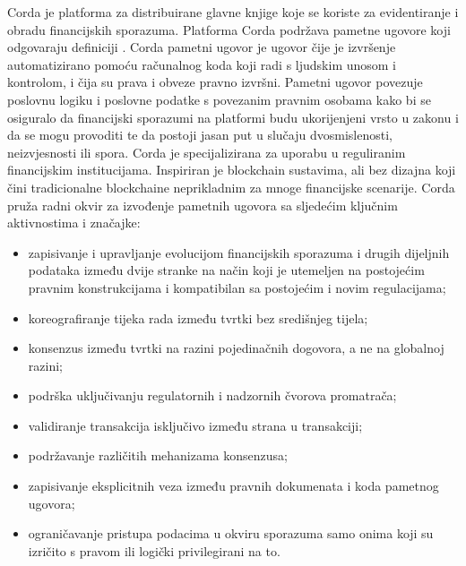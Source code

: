 \documentclass[times, utf8, diplomski]{fer}
\begin{document}
Corda je platforma za distribuirane glavne knjige koje se koriste za evidentiranje i obradu financijskih sporazuma. Platforma Corda podržava pametne ugovore koji odgovaraju definiciji \cite{Corda}. Corda pametni ugovor je ugovor čije je izvršenje automatizirano pomoću računalnog koda koji radi s ljudskim unosom i kontrolom, i čija su prava i obveze pravno izvršni. Pametni ugovor povezuje poslovnu logiku i poslovne podatke s povezanim pravnim osobama kako bi se osiguralo da financijski sporazumi na platformi budu ukorijenjeni vrsto u zakonu i da se mogu provoditi te da postoji jasan put u slučaju dvosmislenosti, neizvjesnosti ili spora.
Corda je specijalizirana za uporabu u reguliranim financijskim institucijama. Inspiriran je blockchain sustavima, ali bez dizajna koji čini tradicionalne blockchaine neprikladnim za mnoge financijske scenarije. Corda pruža radni okvir za izvođenje pametnih ugovora sa sljedećim ključnim aktivnostima i značajke:

\begin{itemize}

\item zapisivanje i upravljanje evolucijom financijskih sporazuma i drugih dijeljnih podataka između dvije stranke na način koji je utemeljen na postojećim pravnim konstrukcijama i kompatibilan sa postojećim i novim regulacijama;

\item koreografiranje tijeka rada između tvrtki bez središnjeg tijela;

\item konsenzus između tvrtki na razini pojedinačnih dogovora, a ne na globalnoj razini;

\item podrška uključivanju regulatornih i nadzornih čvorova promatrača;

\item validiranje transakcija isključivo između strana u transakciji;

\item podržavanje različitih mehanizama konsenzusa;

\item zapisivanje eksplicitnih veza između pravnih dokumenata i koda pametnog ugovora;

\item ograničavanje pristupa podacima u okviru sporazuma samo onima koji su izričito s pravom ili logički privilegirani na to.

\end{itemize}
\end{document}
